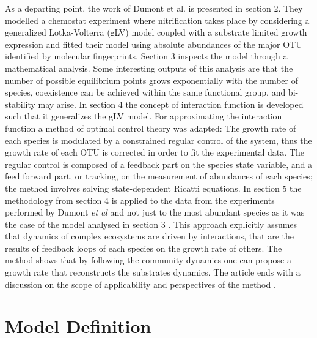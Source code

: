 \documentclass[3p,times]{article}
\begin{document}
As a departing point, the work of Dumont et al.\cite{Dumont2016} is presented in section 2. They modelled a chemostat experiment where nitrification takes place by considering a generalized Lotka-Volterra (gLV) model\cite{Hernandez-Bermejo1997} coupled with a substrate limited growth expression and fitted their model using absolute abundances of the major OTU identified by molecular fingerprints. Section 3 inspects the model through a mathematical analysis. Some interesting outputs of this analysis are that the number of possible equilibrium points grows exponentially with the number of species, coexistence can be achieved within the same functional group, and bi-stability may arise. In section 4 the concept of interaction function is developed such that it generalizes the gLV model. For approximating the interaction function a method of optimal control theory was adapted: The growth rate of each species is modulated by a constrained regular control of the system, thus the growth rate of each OTU is corrected in order to fit the experimental data. The regular control is composed of a feedback part on the species state variable, and a feed forward part, or tracking, on the measurement of abundances of each species; the method involves solving state-dependent Ricatti equations\cite{Cimen2008}. In section 5 the methodology from section 4 is applied to the data from the experiments performed by Dumont \textit{et al}\cite{Dumont2009} and not just to the most abundant species as it was the case of the model analysed in section 3 \cite{Dumont2016}. This approach explicitly assumes that dynamics of complex ecosystems are driven by interactions, that are the results of feedback loops of each species on the growth rate of others. The method shows that by following the community dynamics one can propose a growth rate that reconstructs the substrates dynamics. The article ends with a discussion on the scope of applicability and perspectives of the method . 

\section{Model Definition}
\end{document}
